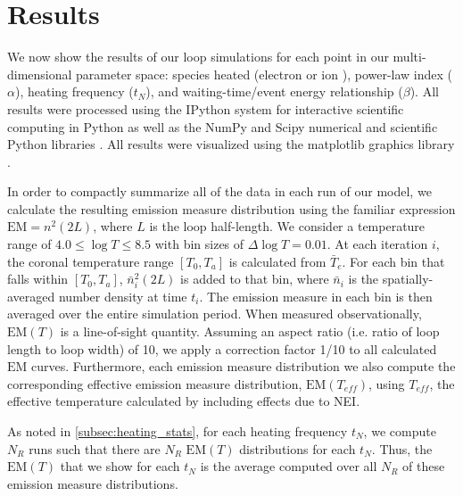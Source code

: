 \documentclass[apj]{emulateapj}
\begin{document}
	\section{Results}
	\label{sec:results}
	\par We now show the results of our loop simulations for each point in our multi-dimensional parameter space: species heated (electron or ion ), power-law index ($\alpha$), heating frequency ($t_N$), and waiting-time/event energy relationship ($\beta$). All results were processed using the IPython system for interactive scientific computing in Python \citep{perez_ipython:_2007} as well as the NumPy and Scipy numerical and scientific Python libraries \citep{van_der_walt_numpy_2011}. All results were visualized using the matplotlib graphics library \citep{hunter_matplotlib:_2007}.
	\par In order to compactly summarize all of the data in each run of our model, we calculate the resulting emission measure distribution using the familiar expression $\mathrm{EM}=n^2(2L)$, where $L$ is the loop half-length. We consider a temperature range of $4.0\le\log{T}\le8.5$ with bin sizes of $\Delta\log{T}=0.01$. At each iteration $i$, the coronal temperature range $[T_0,T_a]$ is calculated from $\bar{T}_e$. For each bin that falls within $[T_0,T_a]$, $\bar{n}_i^2(2L)$ is added to that bin, where $\bar{n}_i$ is the spatially-averaged number density at time $t_i$. The emission measure in each bin is then averaged over the entire simulation period. When measured observationally, $\mathrm{EM}(T)$ is a line-of-sight quantity. Assuming an aspect ratio (i.e. ratio of loop length to loop width) of 10, we apply a correction factor 1/10 to all calculated $\mathrm{EM}$ curves. Furthermore, each emission measure distribution we also compute the corresponding effective emission measure distribution, $\mathrm{EM}(T_{eff})$, using $T_{eff}$, the effective temperature calculated by including effects due to NEI.
	\par As noted in \autoref{subsec:heating_stats}, for each heating frequency $t_N$, we compute $N_R$ runs such that there are $N_R$ $\mathrm{EM}(T)$ distributions for each $t_N$. Thus, the $\mathrm{EM}(T)$ that we show for each $t_N$ is the average computed over all $N_R$ of these emission measure distributions. 
\end{document}

